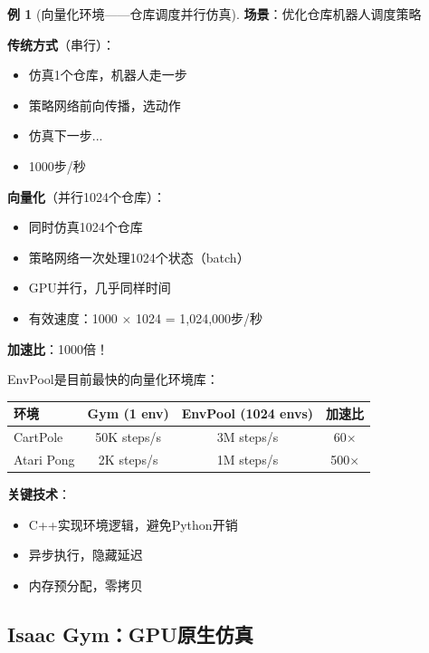 \documentclass[11pt,a4paper]{article}
\theoremstyle{definition}
\newtheorem{example}{例}[section]
\begin{document}
\begin{example}[向量化环境——仓库调度并行仿真]
\textbf{场景}：优化仓库机器人调度策略

\textbf{传统方式}（串行）：
\begin{itemize}
    \item 仿真1个仓库，机器人走一步
    \item 策略网络前向传播，选动作
    \item 仿真下一步...
    \item 1000步/秒
\end{itemize}

\textbf{向量化}（并行1024个仓库）：
\begin{itemize}
    \item 同时仿真1024个仓库
    \item 策略网络一次处理1024个状态（batch）
    \item GPU并行，几乎同样时间
    \item 有效速度：1000 $\times$ 1024 = 1,024,000步/秒
\end{itemize}

\textbf{加速比}：1000倍！
\end{example}

\begin{keypoint}
EnvPool是目前最快的向量化环境库：

\begin{center}
\begin{tabular}{l|c|c|c}
\toprule
环境 & Gym (1 env) & EnvPool (1024 envs) & 加速比 \\
\midrule
CartPole & 50K steps/s & 3M steps/s & 60$\times$ \\
Atari Pong & 2K steps/s & 1M steps/s & 500$\times$ \\
\bottomrule
\end{tabular}
\end{center}

\textbf{关键技术}：
\begin{itemize}
    \item C++实现环境逻辑，避免Python开销
    \item 异步执行，隐藏延迟
    \item 内存预分配，零拷贝
\end{itemize}
\end{keypoint}

\subsection{Isaac Gym：GPU原生仿真}
\end{document}
